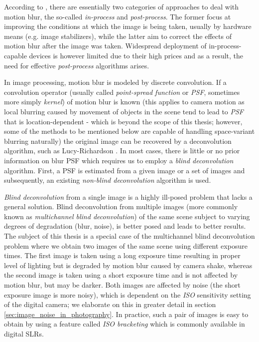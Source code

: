 \documentclass[12pt,notitlepage]{report}
\begin{document}
According to \cite{jia04}, there are essentially two categories of approaches to deal with motion blur, the so-called {\em in-process} and {\em post-process}. The former focus at improving the conditions at which the image is being taken, usually by hardware means (e.g. image stabilizers), while the latter aim to correct the effects of motion blur after the image was taken. Widespread deployment of in-process-capable devices is however limited due to their high prices and as a result, the need for effective {\em post-process} algorithms arises.

In image processing, motion blur is modeled by discrete convolution. If a convolution operator (usually called {\em point-spread function} or {\em PSF}, sometimes more simply {\em kernel}) of motion blur is known (this applies to camera motion as local blurring caused by movement of objects in the scene tend to lead to {\em PSF} that is location-dependent - which is beyond the scope of this thesis; however, some of the methods to be mentioned below are capable of handling space-variant blurring naturally) the original image can be recovered by a deconvolution algorithm, such as Lucy-Richardson \cite{rich72}. In most cases, there is little or no prior information on blur PSF which requires us to employ a {\em blind deconvolution} algorithm. First, a PSF is estimated from a given image or a set of images and subsequently, an existing {\em non-blind deconvolution} algorithm is used. 

{\em Blind deconvolution} from a single image is a highly ill-posed problem that lacks a general solution. Blind deconvolution from multiple images (more commonly known as {\em multichannel blind deconvolution}) of the same scene subject to varying degrees of degradation (blur, noise), is better posed and leads to better results. The subject of this thesis is a special case of the multichannel blind deconvolution problem where we obtain two images of the same scene using different exposure times. The first image is taken using a long exposure time resulting in proper level of lighting but is degraded by motion blur caused by camera shake, whereas the second image is taken using a short exposure time and is not affected by motion blur, but may be darker.  Both images are affected by noise (the short exposure image is more noisy), which is dependent on the {\em ISO} sensitivity setting of the digital camera; we elaborate on this in greater detail in section \ref{sec:image_noise_in_photography}. In practice, such a pair of images is easy to obtain by using a feature called {\em ISO bracketing} which is commonly available in digital SLRs.
 
\end{document}
